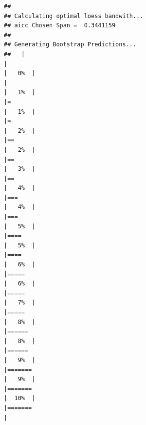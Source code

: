 \documentclass[
  ignorenonframetext,
]{beamer}
\begin{document}
\begin{frame}[fragile]{}
\protect\hypertarget{section-5}{}
\tiny

\begin{verbatim}
## 
## Calculating optimal loess bandwith...
## aicc Chosen Span =  0.3441159 
##  
## Generating Bootstrap Predictions... 
##   |                                                                              |                                                                      |   0%  |                                                                              |                                                                      |   1%  |                                                                              |=                                                                     |   1%  |                                                                              |=                                                                     |   2%  |                                                                              |==                                                                    |   2%  |                                                                              |==                                                                    |   3%  |                                                                              |==                                                                    |   4%  |                                                                              |===                                                                   |   4%  |                                                                              |===                                                                   |   5%  |                                                                              |====                                                                  |   5%  |                                                                              |====                                                                  |   6%  |                                                                              |=====                                                                 |   6%  |                                                                              |=====                                                                 |   7%  |                                                                              |=====                                                                 |   8%  |                                                                              |======                                                                |   8%  |                                                                              |======                                                                |   9%  |                                                                              |=======                                                               |   9%  |                                                                              |=======                                                               |  10%  |                                                                              |=======                                                               | 
\end{verbatim}
\end{frame}
\end{document}
